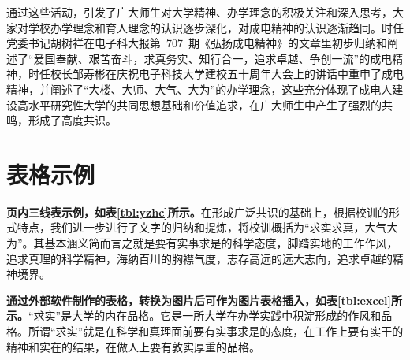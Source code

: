     通过这些活动，引发了广大师生对大学精神、办学理念的积极关注和深入思考，大家对学校办学理念和育人理念的认识逐步深化，对成电精神的认识逐渐趋同。时任党委书记胡树祥在电子科大报第~707~期《弘扬成电精神》的文章里初步归纳和阐述了“爱国奉献、艰苦奋斗，求真务实、知行合一，追求卓越、争创一流”的成电精神，时任校长邹寿彬在庆祝电子科技大学建校五十周年大会上的讲话中重申了成电精神，并阐述了“大楼、大师、大气、大为”的办学理念，这些充分体现了成电人建设高水平研究性大学的共同思想基础和价值追求，在广大师生中产生了强烈的共鸣，形成了高度共识。

\section{表格示例}
    
    {\bfseries 页内三线表示例，如表\ref{tbl:yzhc}所示。}在形成广泛共识的基础上，根据校训的形式特点，我们进一步进行了文字的归纳和提炼，将校训概括为“求实求真，大气大为”。其基本涵义简而言之就是要有实事求是的科学态度，脚踏实地的工作作风，追求真理的科学精神，海纳百川的胸襟气度，志存高远的远大志向，追求卓越的精神境界。
    
    
	{\bfseries 通过外部软件制作的表格，转换为图片后可作为图片表格插入，如表\ref{tbl:excel}所示。}“求实”是大学的内在品格。它是一所大学在办学实践中积淀形成的作风和品格。所谓“求实”就是在科学和真理面前要有实事求是的态度，在工作上要有实干的精神和实在的结果，在做人上要有敦实厚重的品格。

    
